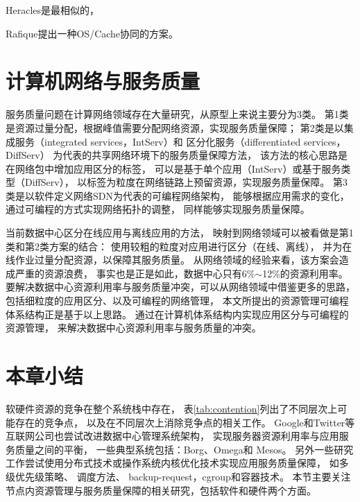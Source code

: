 Heracles是最相似的，

Rafique提出一种OS/Cache协同的方案。


\section{计算机网络与服务质量}
\label{sec:background:sdn}

服务质量问题在计算网络领域存在大量研究，从原型上来说主要分为3类。
第1类是资源过量分配，根据峰值需要分配网络资源，实现服务质量保障；
第2类是以集成服务（integrated services，IntServ）\cite{IntServ}和
区分化服务（differentiated services，DiffServ）\cite{DiffServ}
为代表的共享网络环境下的服务质量保障方法，
该方法的核心思路是在网络包中增加应用区分的标签，
可以是基于单个应用（IntServ）或基于服务类型（DiffServ），
以标签为粒度在网络链路上预留资源，实现服务质量保障。
第3类是以软件定义网络SDN\cite{SDN}为代表的可编程网络架构，
能够根据应用需求的变化，通过可编程的方式实现网络拓扑的调整，
同样能够实现服务质量保障。

当前数据中心区分在线应用与离线应用的方法，
映射到网络领域可以被看做是第1类和第2类方案的结合：
使用较粗的粒度对应用进行区分（在线、离线），
并为在线作业过量分配资源，以保障其服务质量。
从网络领域的经验来看，该方案会造成严重的资源浪费，
事实也是正是如此，数据中心只有6\%$\sim$12\%的资源利用率。
要解决数据中心资源利用率与服务质量冲突，可以从网络领域中借鉴更多的思路，
包括细粒度的应用区分、以及可编程的网络管理，
本文所提出的资源管理可编程体系结构正是基于以上思路。
通过在计算机体系结构内实现应用区分与可编程的资源管理，
来解决数据中心资源利用率与服务质量的冲突。



\section{本章小结}

软硬件资源的竞争在整个系统栈中存在，
表\ref{tab:contention}列出了不同层次上可能存在的竞争点，
以及在不同层次上消除竞争点的相关工作。
Google和Twitter等互联网公司也尝试改进数据中心管理系统架构，
实现服务器资源利用率与应用服务质量之间的平衡，
一些典型系统包括：Borg\cite{borg:2015}、Omega\cite{Schwarzkopf_omega_2013}和
Mesos\cite{Hindman:2011:Mesos}。
另外一些研究工作尝试使用分布式技术或操作系统内核优化技术实现应用服务质量保障，
如多级优先级策略\cite{Reiss_googletrace_2012}、
调度方法\cite{delimitrou_paragon:_2013, delimitrou_quasar:_2014, mars_heterogeneity_2011,
kozyrakis_reconciling_2014, Novakovi:ATC2013}、
backup-request\cite{dean_tail_2013}，cgroup\cite{cgroup}和容器技术\cite{lxc}。 
本节主要关注节点内资源管理与服务质量保障的相关研究，包括软件和硬件两个方面。

